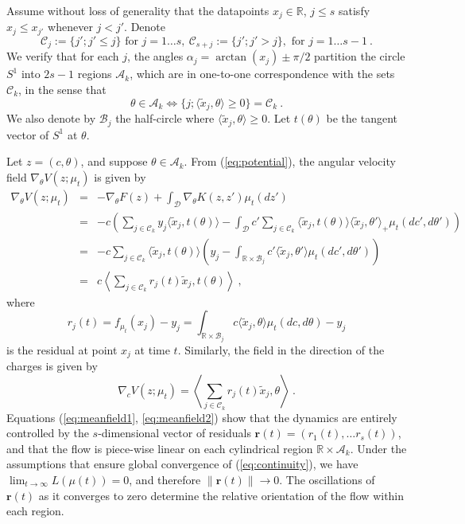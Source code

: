 Assume without loss of generality that the datapoints $x_j \in \mathbb{R}$, $j\leq s$ satisfy $x_j \leq x_{j'}$ whenever $j < j'$.
Denote 
$$\mathcal{C}_j := \{ j' ; j' \leq j\} \text{ for } j=1\dots s,~\mathcal{C}_{s+j} := \{ j' ; j' > j \},\text{ for }j=1\dots s-1~.$$
We verify that for each $j$, the angles $\alpha_j = \arctan(x_j) \pm \pi/2$ partition the circle $S^1$ into $2s-1$ regions $\mathcal{A}_k$, 
which are in one-to-one correspondence with the sets $\mathcal{C}_k$, in the sense that 
$$\theta \in \mathcal{A}_k \Longleftrightarrow \{j ; \langle \tilde{x}_j , \theta \rangle \geq 0 \} = \mathcal{C}_k~.$$
We also denote by $\mathcal{B}_j$ 
the half-circle where $\langle \tilde{x}_j, \theta\rangle \geq 0$. Let $t(\theta)$ be the tangent vector of $S^1$ at $\theta$.

Let $z=(c,\theta)$, and suppose $\theta \in \mathcal{A}_k$. From (\ref{eq:potential}), the angular velocity field $\nabla_\theta V(z; \mu_t)$ is given by 
\begin{eqnarray}
\label{eq:meanfield1}
    \nabla_\theta V(z; \mu_t) &=& -\nabla_\theta F(z) + \int_\mathcal{D} \nabla_\theta K(z, z') \mu_t(dz') \nonumber \\
    &=& -c\left( \sum_{j \in \mathcal{C}_k} y_j \langle \tilde{x}_j, t(\theta)\rangle  -\int_\mathcal{D} c'\sum_{j \in \mathcal{C}_k} \langle \tilde{x}_j,t(\theta)\rangle \langle \tilde{x}_j, \theta' \rangle_+ \mu_t(dc', d\theta') \right) \nonumber \\
    &=& -c \sum_{j \in \mathcal{C}_k} \langle \tilde{x}_j, t(\theta)\rangle \left(y_j - \int_{\mathbb{R} \times \mathcal{B}_j} c' \langle \tilde{x}_j, \theta' \rangle \mu_t(dc', d\theta') \right) \nonumber \\
    &=& c \left \langle \sum_{j \in \mathcal{C}_k} r_j(t) \tilde{x}_j, t(\theta) \right \rangle~,
\end{eqnarray}
where 
$$r_j(t) = f_{\mu_t}(x_j) - y_j =    \int_{\mathbb{R} \times \mathcal{B}_j} c \langle \tilde{x}_j,\theta  \rangle \mu_t(dc, d\theta)  - y_j$$
is the residual at point $x_j$ at time $t$. 
Similarly, the field in the direction of the charges is given by
\begin{equation}
\label{eq:meanfield2}
    \nabla_c V(z; \mu_t) =  \left \langle \sum_{j \in \mathcal{C}_k} r_j(t) \tilde{x}_j, \theta \right \rangle ~.
\end{equation}
Equations (\ref{eq:meanfield1}, \ref{eq:meanfield2}) show that the dynamics are entirely controlled by the 
$s$-dimensional vector of residuals $\mathbf{r}(t)=(r_1(t), \dots r_s(t))$, and that the flow is piece-wise linear 
on each cylindrical region $\mathbb{R} \times \mathcal{A}_k$. 
Under the assumptions that ensure 
global convergence of (\ref{eq:continuity}), we have $\lim_{t \to \infty} L(\mu(t)) = 0$, 
and therefore $\| \mathbf{r}(t) \| \to 0$. The oscillations of $\mathbf{r}(t)$ as it converges 
to zero determine the relative orientation of the flow within each region. 

